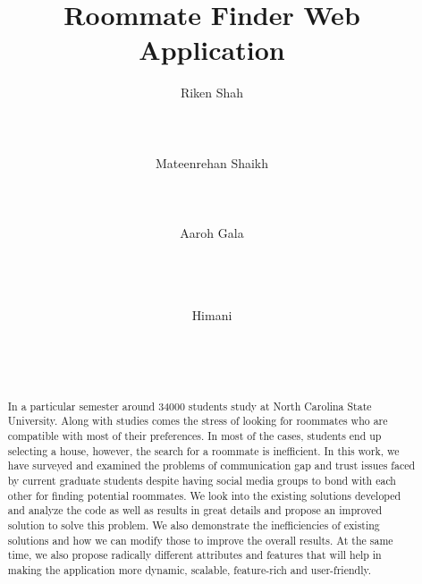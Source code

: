\documentclass{sig-alternate-05-2015}
\begin{document}
\title{ Roommate Finder Web Application}



\author{
\alignauthor
Riken Shah\\
       \\
       \\
       \\
\alignauthor
Mateenrehan Shaikh\\
        \\
       \\
       \\
\alignauthor Aaroh Gala\\
\\
       \\
       \\
\and
\hspace{1cm}
       \alignauthor Himani\\
       \\
       \\
       \\
\and       
}
\sloppy


\maketitle
\begin{abstract}
In a particular semester around 34000 students study at North Carolina State University. Along with studies comes the stress of looking for roommates who are compatible with most of their preferences. In most of the cases, students end up selecting a house, however, the search for a roommate is inefficient. In this work, we have surveyed and examined the problems of communication gap and trust issues faced by current graduate students despite having social media groups to bond with each other for finding potential roommates. We look into the existing solutions developed and analyze the code as well as results in great details and propose an improved solution to solve this problem. We also demonstrate the inefficiencies of existing solutions and how we can modify those to improve the overall results. At the same time, we also propose radically different attributes and features that will help in making the application more dynamic, scalable, feature-rich and user-friendly.
\end{abstract}
\end{document}
